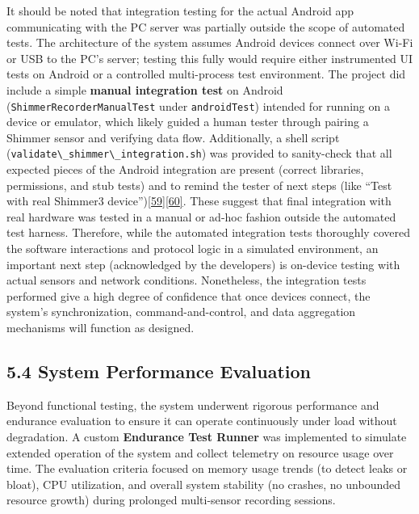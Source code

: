 \documentclass[12pt,a4paper]{article}
\begin{document}
It should be noted that integration testing for the actual Android app communicating with the PC server was partially outside the scope of automated tests. The architecture of the system assumes Android devices connect over Wi-Fi or USB to the PC's server; testing this fully would require either instrumented UI tests on Android or a controlled multi-process test environment. The project did include a simple \textbf{manual integration test} on Android (\passthrough{\lstinline!ShimmerRecorderManualTest!} under \passthrough{\lstinline!androidTest!}) intended for running on a device or emulator, which likely guided a human tester through pairing a Shimmer sensor and verifying data flow. Additionally, a shell script (\passthrough{\lstinline!validate\_shimmer\_integration.sh!}) was provided to sanity-check that all expected pieces of the Android integration are present (correct libraries, permissions, and stub tests) and to remind the tester of next steps (like ``Test with real Shimmer3 device'')\href{https://github.com/buccancs/bucika_gsr/blob/7048f7f6a7536f5cd577ed2184800d3dad97fd08/AndroidApp/validate_shimmer_integration.sh\#L152-L160}{{[}59{]}}\href{https://github.com/buccancs/bucika_gsr/blob/7048f7f6a7536f5cd577ed2184800d3dad97fd08/AndroidApp/validate_shimmer_integration.sh\#L156-L163}{{[}60{]}}. These suggest that final integration with real hardware was tested in a manual or ad-hoc fashion outside the automated test harness. Therefore, while the automated integration tests thoroughly covered the software interactions and protocol logic in a simulated environment, an important next step (acknowledged by the developers) is on-device testing with actual sensors and network conditions. Nonetheless, the integration tests performed give a high degree of confidence that once devices connect, the system's synchronization, command-and-control, and data aggregation mechanisms will function as designed.

\subsection{5.4 System Performance Evaluation}\label{system-performance-evaluation}

Beyond functional testing, the system underwent rigorous performance and endurance evaluation to ensure it can operate continuously under load without degradation. A custom \textbf{Endurance Test Runner} was implemented to simulate extended operation of the system and collect telemetry on resource usage over time. The evaluation criteria focused on memory usage trends (to detect leaks or bloat), CPU utilization, and overall system stability (no crashes, no unbounded resource growth) during prolonged multi-sensor recording sessions.
\end{document}
